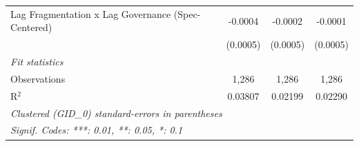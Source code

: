 \begin{table}[H]
\begin{tabular}{lccc}
      Lag Fragmentation x Lag Governance (Spec-Centered) & -0.0004                     & -0.0002                          & -0.0001\\   
                                                         & (0.0005)                    & (0.0005)                         & (0.0005)\\   
      \midrule
      \emph{Fit statistics}\\
      Observations                                       & 1,286                       & 1,286                            & 1,286\\  
      R$^2$                                              & 0.03807                     & 0.02199                          & 0.02290\\  
      \midrule \midrule
      \multicolumn{4}{l}{\emph{Clustered (GID\_0) standard-errors in parentheses}}\\
      \multicolumn{4}{l}{\emph{Signif. Codes: ***: 0.01, **: 0.05, *: 0.1}}\\
   \end{tabular}
\end{table}



